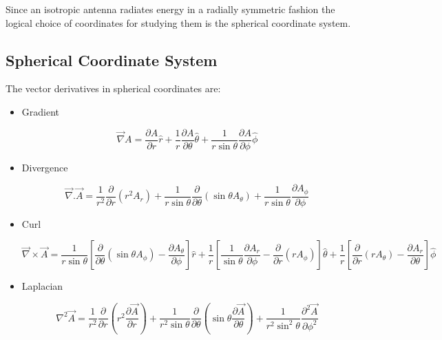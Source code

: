Since an isotropic antenna radiates energy in a radially symmetric fashion the logical choice of coordinates for studying them is the spherical coordinate system.

\subsection{Spherical Coordinate System}

The vector derivatives in spherical coordinates are:

\begin{itemize}

   \item Gradient

      \begin{equation}
      \vec{\nabla} A = \frac{\partial A}{\partial r}\hat{r}+\frac{1}{r}\frac{\partial A}{\partial \theta}\hat{\theta}+\frac{1}{r\sin\theta}\frac{\partial A}{\partial \phi}\hat{\phi}
      \end{equation}

   \item Divergence

      \begin{equation}\label{divergence}
      \vec{\nabla}.\vec{A} = \frac{1}{r^2}\frac{\partial}{\partial r}(r^2A_r)+\frac{1}{r\sin\theta}\frac{\partial}{\partial\theta}(\sin\theta A_\theta)+\frac{1}{r\sin\theta}\frac{\partial A_\phi}{\partial\phi}
      \end{equation}

   \item Curl

      \begin{equation}
      \vec{\nabla}\times\vec{A} = \frac{1}{r\sin\theta}\left[\frac{\partial}{\partial\theta}(\sin\theta A_\phi)-\frac{\partial A_\theta}{\partial\phi}\right]\hat{r}+\frac{1}{r}\left[\frac{1}{\sin\theta}\frac{\partial A_r}{\partial\phi}-\frac{\partial}{\partial r}(rA_\phi)\right]\hat{\theta}+\frac{1}{r}\left[\frac{\partial}{\partial r}(rA_\theta)-\frac{\partial A_r}{\partial \theta}\right]\hat{\phi}
      \end{equation}

   \item Laplacian

      \begin{equation}\label{laplacian}
      \nabla^2 \vec{A} = \frac{1}{r^2}\frac{\partial}{\partial r}(r^2\frac{\partial\vec{A}}{\partial r})+\frac{1}{r^2\sin\theta}\frac{\partial}{\partial\theta}(\sin\theta\frac{\partial\vec{A}}{\partial \theta})+\frac{1}{r^2\sin^2\theta}\frac{\partial^2\vec{A}}{\partial \phi^2}
      \end{equation}

\end{itemize}


